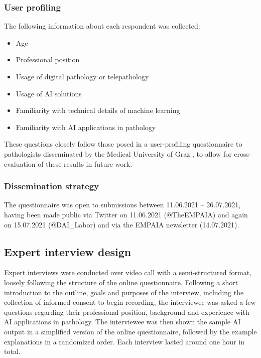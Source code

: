 \subsubsection{User profiling}

The following information about each respondent was collected:

\begin{itemize}[noitemsep]
    \item Age
    \item Professional position
    \item Usage of digital pathology or telepathology
    \item Usage of AI solutions
    \item Familiarity with technical details of machine learning
    \item Familiarity with AI applications in pathology
\end{itemize}

These questions closely follow those posed in a user-profiling questionnaire to pathologists disseminated by the Medical University of Graz \cite{HolzingerEtAl:2021:PersonasToolbox}, to allow for cross-evaluation of these results in future work.

\subsubsection{Dissemination strategy}

The questionnaire was open to submissions between 11.06.2021 -- 26.07.2021, having been made public via Twitter on 11.06.2021 (@TheEMPAIA) and again on 15.07.2021 (@DAI\_Labor) and via the EMPAIA newsletter (14.07.2021).

\subsection{Expert interview design}
\label{sec:interviewdesign}
Expert interviews were conducted over video call with a semi-structured format, loosely following the structure of the online questionnaire. Following a short introduction to the outline, goals and purposes of the interview, including the collection of informed consent to begin recording, the interviewee was asked a few questions regarding their professional position, background and experience with AI applications in pathology. The interviewee was then shown the sample AI output in a simplified version of the online questionnaire, followed by the example explanations in a randomized order. Each interview lasted around one hour in total.

